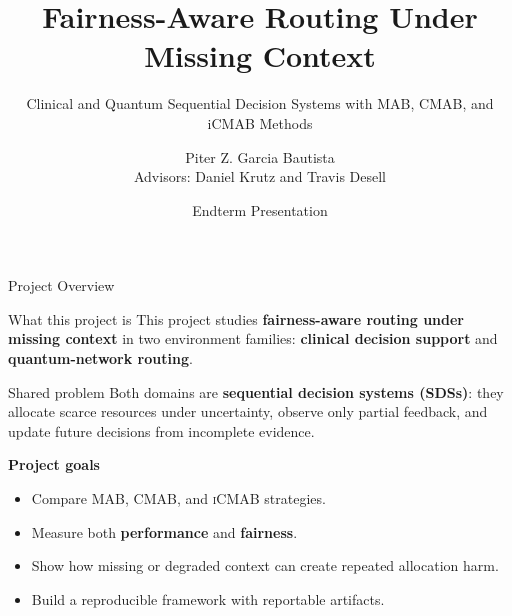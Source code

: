 \documentclass[aspectratio=169,10pt]{beamer}
\title[Fairness-Aware Routing]{Fairness-Aware Routing Under Missing Context}
\subtitle{Clinical and Quantum Sequential Decision Systems with MAB, CMAB, and iCMAB Methods}
\author[P. Z. Garcia Bautista]{Piter Z. Garcia Bautista\\Advisors: Daniel Krutz and Travis Desell}
\institute[RIT]{Rochester Institute of Technology\\DSCI 601 -- Applied Data Science I}
\date{Endterm Presentation}
\newcommand{\mab}{\textsc{MAB}}
\newcommand{\cmab}{\textsc{CMAB}}
\newcommand{\icmab}{\textsc{iCMAB}}
\begin{document}
\begin{frame}
  \titlepage
\end{frame}

\begin{frame}{Project Overview}
\begin{block}{What this project is}
This project studies \textbf{fairness-aware routing under missing context} in two environment families:
\textbf{clinical decision support} and \textbf{quantum-network routing}.
\end{block}

\vspace{0.5em}

\begin{block}{Shared problem}
Both domains are \textbf{sequential decision systems (SDSs)}:
they allocate scarce resources under uncertainty, observe only partial feedback,
and update future decisions from incomplete evidence.
\end{block}

\vspace{0.5em}

\textbf{Project goals}
\begin{itemize}
    \item Compare \mab, \cmab, and \icmab{} strategies.
    \item Measure both \textbf{performance} and \textbf{fairness}.
    \item Show how missing or degraded context can create repeated allocation harm.
    \item Build a reproducible framework with reportable artifacts.
\end{itemize}
\end{frame}
\end{document}
